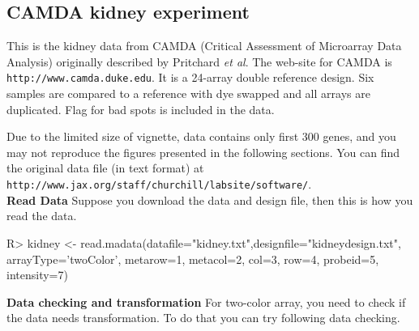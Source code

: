 \subsection{CAMDA kidney experiment}
This is the kidney data from CAMDA (Critical Assessment 
of Microarray Data Analysis) originally described by Pritchard {\it et al}. The web-site for CAMDA is 
{\tt http://www.camda.duke.edu}. It is a 24-array double reference
design. Six samples are compared to a reference with dye swapped
and all arrays are duplicated. Flag for bad spots is included in the 
data. 

Due to the limited size of vignette, data contains only first 300 genes, and you
may not reproduce the figures presented in the following sections. You can find the original data file (in text format) at {\tt
http://www.jax.org/staff/churchill/labsite/software/}.\\ 
{\bf Read Data} Suppose you download the data and design file, then this is how you read the data. 
\begin{Sinput}
R> kidney <- read.madata(datafile="kidney.txt",designfile="kidneydesign.txt",
   arrayType='twoColor', metarow=1, metacol=2, col=3, row=4, probeid=5, intensity=7)
\end{Sinput}
{\bf Data checking and transformation} For two-color array, you need to check
if the data needs transformation. To do that you can try following data checking.  
